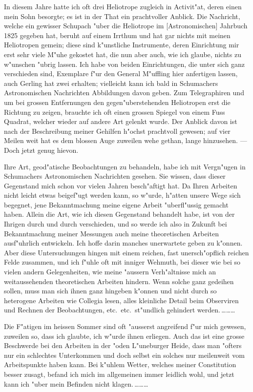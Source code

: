\documentclass[12pt,a4paper]{article}
\theoremstyle{plain}
\theoremstyle{definition}
\theoremstyle{remark}
\begin{document}
In diesem Jahre hatte ich oft drei Heliotrope zugleich in Activit"at, deren einen mein Sohn besorgte; es ist in der That ein prachtvoller Anblick. Die Nachricht, welche ein gewisser Schupach "uber die Heliotrope im [Astronomischen] Jahrbuch 1825 gegeben hat, beruht auf einem Irrthum und hat gar nichts mit meinen Heliotropen gemein; diese sind k"unstliche Instrumente, deren Einrichtung mir erst sehr viele M"uhe gekostet hat, die nun aber auch, wie ich glaube, nichts zu w"unschen "ubrig lassen. Ich habe von beiden Einrichtungen, die unter sich ganz verschieden sind, Exemplare f"ur den General M"uffling hier anfertigen lassen, auch Gerling hat zwei erhalten; vielleicht kann ich bald in Schumachers Astronomischen Nachrichten Abbildungen davon geben. Zum Telegraphiren und um bei grossen Entfernungen den gegen"uberstehenden Heliotropen erst die Richtung zu zeigen, brauchte ich oft einen grossen Spiegel von einem Fuss Quadrat, welcher wieder auf andere Art gelenkt wurde. Der Anblick davon ist nach der Beschreibung meiner Gehilfen h"ochst prachtvoll gewesen; auf vier Meilen weit hat es dem blossen Auge zuweilen wehe gethan, lange hinzusehen. --- Doch jetzt genug hievon.

Ihre Art, geod"atische Beobachtungen zu behandeln, habe ich mit Vergn"ugen in Schumachers Astronomischen Nachrichten gesehen. Sie wissen, dass dieser Gegenstand mich schon vor vielen Jahren besch"aftigt hat. Da Ihren Arbeiten nicht leicht etwas beigef"ugt werden kann, so w"urde, h"atten unsere Wege sich begegnet, jene Bekanntmachung meine eigene Arbeit "uberfl"ussig gemacht haben. Allein die Art, wie ich diesen Gegenstand behandelt habe, ist von der Ihrigen durch und durch verschieden, und so werde ich also in Zukunft bei Bekanntmachung meiner Messungen auch meine theoretischen Arbeiten ausf"uhrlich entwickeln. Ich hoffe darin manches unerwartete geben zu k"onnen. Aber diese Untersuchungen hingen mit einem reichen, fast unersch"opflich reichen Felde zusammen, und ich f"uhle oft mit inniger Wehmuth, bei dieser wie bei so vielen andern Gelegenheiten, wie meine "aussern Verh"altnisse mich an weitaussehenden theoretischen Arbeiten hindern. Wenn solche ganz gedeihen sollen, muss man sich ihnen ganz hingeben k"onnen und nicht durch so heterogene Arbeiten wie Collegia lesen, alles kleinliche Detail beim Observiren und Rechnen der Beobachtungen, etc.\ etc.\ st"undlich gehindert werden.\,\ldots\ldots\ldots

\newpage
\noindent Die F"atigen im heissen Sommer sind oft "ausserst angreifend f"ur mich gewesen, zuweilen so, dass ich glaubte, ich w"urde ihnen erliegen. Auch das ist eine grosse Beschwerde bei den Arbeiten in der "oden L"uneburger Heide, dass man "ofters nur ein schlechtes Unterkommen und doch selbst ein solches nur meilenweit vom Arbeitspunkte haben kann. Bei k"uhlem Wetter, welches meiner Constitution besser zusagt, befand ich mich im allgemeinen immer leidlich wohl, und jetzt kann ich "uber mein Befinden nicht klagen.\,\ldots\ldots\ldots
\end{document}
